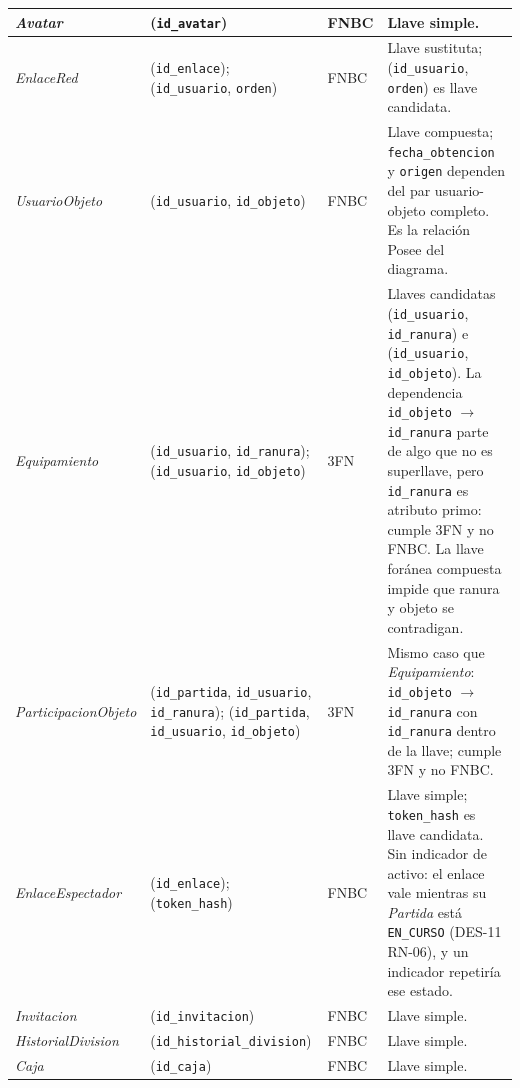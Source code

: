\begin{center}
\begin{longtable}{|L{0.19\textwidth}|L{0.23\textwidth}|L{0.08\textwidth}|L{0.38\textwidth}|}
\textit{Avatar} & (\texttt{id\_\allowbreak{}avatar}) & FNBC & Llave simple. \\ \hline
\textit{Enlace\-Red} & (\texttt{id\_\allowbreak{}enlace}); (\texttt{id\_\allowbreak{}usuario}, \texttt{orden}) & FNBC & Llave sustituta; (\texttt{id\_\allowbreak{}usuario}, \texttt{orden}) es llave candidata. \\ \hline
\textit{Usuario\-Objeto} & (\texttt{id\_\allowbreak{}usuario}, \texttt{id\_\allowbreak{}objeto}) & FNBC & Llave compuesta; \texttt{fecha\_\allowbreak{}obtencion} y \texttt{origen} dependen del par usuario-objeto completo. Es la relación Posee del diagrama. \\ \hline
\textit{Equipamiento} & (\texttt{id\_\allowbreak{}usuario}, \texttt{id\_\allowbreak{}ranura}); (\texttt{id\_\allowbreak{}usuario}, \texttt{id\_\allowbreak{}objeto}) & 3FN & Llaves candidatas (\texttt{id\_\allowbreak{}usuario}, \texttt{id\_\allowbreak{}ranura}) e (\texttt{id\_\allowbreak{}usuario}, \texttt{id\_\allowbreak{}objeto}). La dependencia \texttt{id\_\allowbreak{}objeto} $\rightarrow$ \texttt{id\_\allowbreak{}ranura} parte de algo que no es superllave, pero \texttt{id\_\allowbreak{}ranura} es atributo primo: cumple 3FN y no FNBC. La llave foránea compuesta impide que ranura y objeto se contradigan. \\ \hline
\textit{Participacion\-Objeto} & (\texttt{id\_\allowbreak{}partida}, \texttt{id\_\allowbreak{}usuario}, \texttt{id\_\allowbreak{}ranura}); (\texttt{id\_\allowbreak{}partida}, \texttt{id\_\allowbreak{}usuario}, \texttt{id\_\allowbreak{}objeto}) & 3FN & Mismo caso que \textit{Equipamiento}: \texttt{id\_\allowbreak{}objeto} $\rightarrow$ \texttt{id\_\allowbreak{}ranura} con \texttt{id\_\allowbreak{}ranura} dentro de la llave; cumple 3FN y no FNBC. \\ \hline
\textit{Enlace\-Espectador} & (\texttt{id\_\allowbreak{}enlace}); (\texttt{token\_\allowbreak{}hash}) & FNBC & Llave simple; \texttt{token\_\allowbreak{}hash} es llave candidata. Sin indicador de activo: el enlace vale mientras su \textit{Partida} está \texttt{EN\_\allowbreak{}CURSO} (\mbox{DES-11} \mbox{RN-06}), y un indicador repetiría ese estado. \\ \hline
\textit{Invitacion} & (\texttt{id\_\allowbreak{}invitacion}) & FNBC & Llave simple. \\ \hline
\textit{Historial\-Division} & (\texttt{id\_\allowbreak{}historial\_\allowbreak{}division}) & FNBC & Llave simple. \\ \hline
\textit{Caja} & (\texttt{id\_\allowbreak{}caja}) & FNBC & Llave simple. \\ \hline

\end{longtable}
\end{center}

